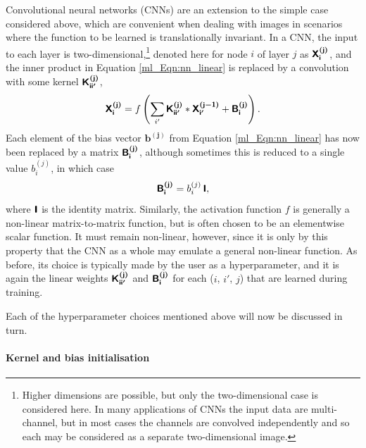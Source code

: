 Convolutional neural networks (CNNs) are an extension to the simple case considered above, which are convenient when dealing with images in scenarios where the function to be learned is translationally invariant. In a CNN, the input to each layer is two-dimensional,\footnote{Higher dimensions are possible, but only the two-dimensional case is considered here. In many applications of CNNs the input data are multi-channel, but in most cases the channels are convolved independently and so each may be considered as a separate two-dimensional image.} denoted here for node $i$ of layer $j$ as $\bm{\mathsf{X^{(j)}_i}}$, and the inner product in Equation \eqref{ml_Eqn:nn_linear} is replaced by a convolution with some kernel $\bm{\mathsf{K^{(j)}_{ii'}}}$,
\begin{equation}
\bm{\mathsf{X^{(j)}_i}} = f \left(
\sum_{i'}
\bm{\mathsf{K^{(j)}_{i i'}}} *
\bm{\mathsf{X^{(j - 1)}_{i'}}}
+ \bm{\mathsf{B^{(j)}_i}} \right).
\end{equation}
Each element of the bias vector $\bm{b^{(j)}}$ from Equation \eqref{ml_Eqn:nn_linear} has now been replaced by a matrix $\bm{\mathsf{B^{(j)}_i}}$, although sometimes this is reduced to a single value $b^{(j)}_i$, in which case
\begin{equation}
\bm{\mathsf{B^{(j)}_i}}
= b^{(j)}_i \, \bm{\mathsf{I}},
\end{equation}
where $\bm{\mathsf{I}}$ is the identity matrix. Similarly, the activation function $f$ is generally a non-linear matrix-to-matrix function, but is often chosen to be an elementwise scalar function. It must remain non-linear, however, since it is only by this property that the CNN as a whole may emulate a general non-linear function. As before, its choice is typically made by the user as a hyperparameter, and it is again the linear weights $\bm{\mathsf{K^{(j)}_{ii'}}}$ and $\bm{\mathsf{B^{(j)}_i}}$ for each ($i$, $i'$, $j$) that are learned during training.

Each of the hyperparameter choices mentioned above will now be discussed in turn.

\paragraph{Kernel and bias initialisation}

